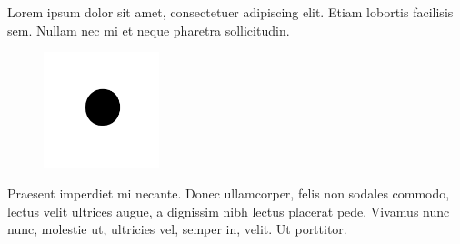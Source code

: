 Lorem ipsum dolor sit amet, consectetuer adipiscing elit. Etiam lobortis facilisis sem. Nullam nec mi et neque pharetra sollicitudin.
\begin{figure}[htbp]
   \includegraphics[width=0.3\textwidth]{images/fig1.png}
\end{figure}

Praesent imperdiet mi necante. Donec ullamcorper, felis non sodales commodo, lectus velit ultrices augue,
a dignissim nibh lectus placerat pede. Vivamus nunc nunc, molestie ut, ultricies
vel, semper in, velit. Ut porttitor.


